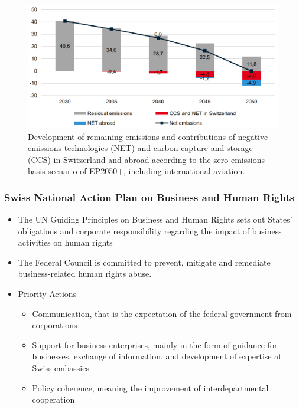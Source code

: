 \documentclass[11pt]{article}
\theoremstyle{definition}
\begin{document}
\begin{figure}[H]
	\centering
	\includegraphics[width=0.8\linewidth]{img/development_remaining_emissions_plan_switzerland}
	\caption{Development of remaining emissions and contributions of negative emissions technologies (NET) and carbon capture and storage (CCS) in Switzerland and abroad according to the zero emissions basis scenario of EP2050+, including international aviation.}
	\label{fig:developmentremainingemissionsplanswitzerland}
\end{figure}

\subsubsection{Swiss National Action Plan on Business and Human Rights}
\begin{itemize}
	\item The UN Guiding Principles on Business and Human Rights sets out States' obligations and corporate responsibility regarding the impact of business activities on human rights
	\item The Federal Council is committed to prevent, mitigate and remediate business-related human rights abuse.
	\item Priority Actions
	\begin{itemize}
		\item Communication, that is the expectation of the federal government from corporations
		\item Support for business enterprises, mainly in the form of guidance for businesses, exchange of information, and development of expertise at Swiss embassies
		\item Policy coherence, meaning the improvement of interdepartmental cooperation
	\end{itemize}
\end{itemize}
\end{document}

